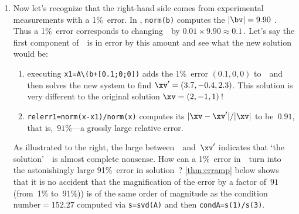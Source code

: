 \begin{example}
\begin{enumerate}
\item Now let's recognize that the right-hand side comes from experimental measurements with a 1\%~error.
In \script, \verb|norm(b)| computes the  \(|\bv|=9.90\) \twodp.
Thus a 1\%~error corresponds to changing~\bv\ by \(0.01\times 9.90\approx 0.1\)\,.
Let's say the first component of~\bv\ is in error by this amount and see what the new solution would be:
\setbox\ajrqrbox\hbox{}%
\marginajrbox%
\begin{enumerate}
\item executing \verb|x1=A\(b+[0.1;0;0])| adds the  1\%~error \((0.1,0,0)\) to~\bv\ and then solves the new system to find \(\xv'=(3.7,-0.4,2.3)\).
This solution is very different to the original solution \(\xv=(2,-1,1)\)\,!
\item {}\verb|relerr1=norm(x-x1)/norm(x)| computes its  \(|\xv-\xv'|/|\xv|\) to be~\(0.91\), that is,~\(91\%\)---a grossly large relative error.
\end{enumerate}

\begin{figbox}{}%
As illustrated to the right, the large  between~\xv\ and~\(\xv'\) indicates that `the solution'~\xv\ is almost complete nonsense.
How can a 1\%~error in~\bv\ turn into the astonishingly large 91\%~error in solution~\xv?  
\cref{thm:erramp} below shows that it is no accident that the magnification of the error by a factor of~\(91\) (from~1\% to~91\%)) is of the same order of magnitude as the condition number\({}=152.27\) computed via \verb|s=svd(A)| and then \verb|condA=s(1)/s(3)|.
\end{figbox}



\end{enumerate}
\end{example}
